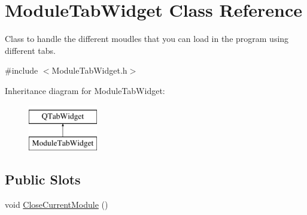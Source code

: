 \hypertarget{class_module_tab_widget}{\section{Module\+Tab\+Widget Class Reference}
\label{class_module_tab_widget}
}


Class to handle the different moudles that you can load in the program using different tabs.  




{\ttfamily \#include $<$Module\+Tab\+Widget.\+h$>$}

Inheritance diagram for Module\+Tab\+Widget\+:\begin{figure}[H]
\begin{center}
\leavevmode
\includegraphics[height=2.000000cm]{class_module_tab_widget}
\end{center}
\end{figure}
\subsection*{Public Slots}
\begin{DoxyCompactItemize}
\item 
void \hyperlink{class_module_tab_widget_abe785015185ca333348f8cbb3384ad50}{Close\+Current\+Module} ()
\end{DoxyCompactItemize}
